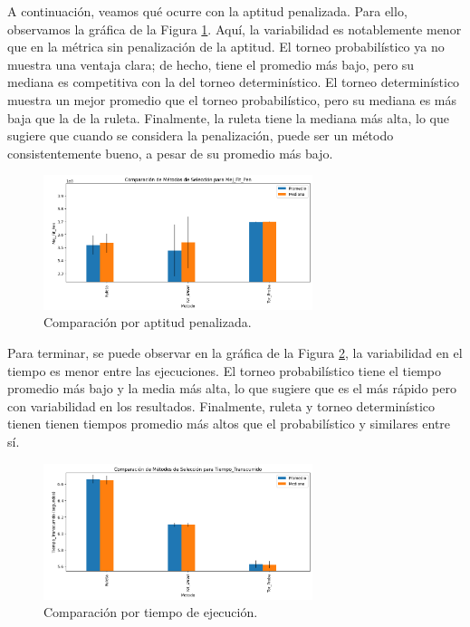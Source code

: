 \documentclass[12pt,a4paper]{book}
\begin{document}
A continuación, veamos qué ocurre con la aptitud penalizada. Para ello, observamos la gráfica de la Figura \ref{fig:comparar_metodos_2}. Aquí, la variabilidad es notablemente menor que en la métrica sin penalización de la aptitud. El torneo probabilístico ya no muestra una ventaja clara; de hecho, tiene el promedio más bajo, pero su mediana es competitiva con la del torneo determinístico. El torneo determinístico muestra un mejor promedio que el torneo probabilístico, pero su mediana es más baja que la de la ruleta. Finalmente, la ruleta tiene la mediana más alta, lo que sugiere que cuando se considera la penalización, puede ser un método consistentemente bueno, a pesar de su promedio más bajo.  

\begin{figure}[h] 
    	\begin{center}
    	\includegraphics[width=0.7\textwidth]{img/compara_metodos_2.png}
    	\end{center}
    	\caption{Comparación por aptitud penalizada.}
    	\label{fig:comparar_metodos_2}
	\end{figure}

Para terminar, se puede observar en la gráfica de la Figura \ref{fig:comparar_metodos_3}, la variabilidad en el tiempo es menor entre las ejecuciones. El torneo probabilístico tiene el tiempo promedio más bajo y la media más alta, lo que sugiere que es el más rápido pero con variabilidad en los resultados. Finalmente, ruleta y torneo determinístico tienen tienen tiempos promedio más altos que el probabilístico y similares entre sí.      

\begin{figure}[h] 
    	\begin{center}
    	\includegraphics[width=0.7\textwidth]{img/compara_metodos_3.png}
    	\end{center}
    	\caption{Comparación por tiempo de ejecución.}
    	\label{fig:comparar_metodos_3}
	\end{figure}
\end{document}
